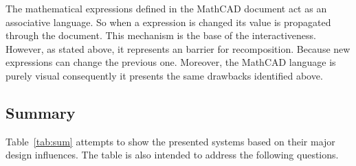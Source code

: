 The mathematical expressions defined in the MathCAD document act as an associative language. So when a expression is changed its value is propagated through the document. This mechanism is the base of the interactiveness. However, as stated above, it represents an barrier for recomposition. Because new expressions can change the previous one. Moreover, the MathCAD language is purely visual consequently it presents the same drawbacks identified above.

\subsection{Summary}

Table~\ref{tab:sum} attempts to show the presented systems based on their major design influences. The table is also intended to address the following questions.

